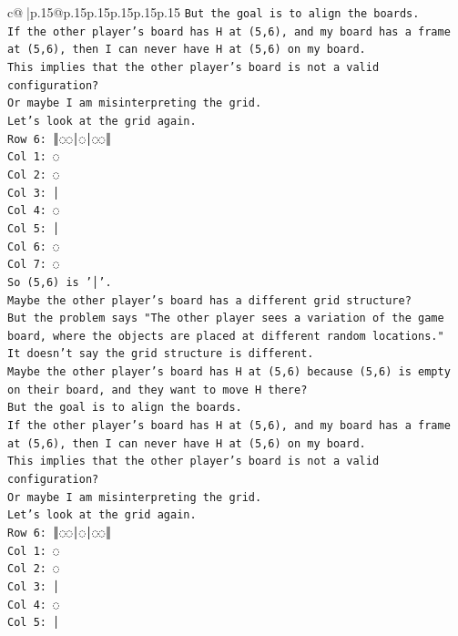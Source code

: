 \documentclass{article}
\begin{document}
{\begin{supertabular}{c@{$\;$}|p{.15\linewidth}@{}p{.15\linewidth}p{.15\linewidth}p{.15\linewidth}p{.15\linewidth}p{.15\linewidth}}
{{{\texttt{But the goal is to align the boards.} \\
\texttt{If the other player's board has H at (5,6), and my board has a frame at (5,6), then I can never have H at (5,6) on my board.} \\
\texttt{This implies that the other player's board is not a valid configuration?} \\
\texttt{Or maybe I am misinterpreting the grid.} \\
\texttt{Let's look at the grid again.} \\
\texttt{Row 6: ║◌◌│◌│◌◌║} \\
\texttt{Col 1: ◌} \\
\texttt{Col 2: ◌} \\
\texttt{Col 3: │} \\
\texttt{Col 4: ◌} \\
\texttt{Col 5: │} \\
\texttt{Col 6: ◌} \\
\texttt{Col 7: ◌} \\
\texttt{So (5,6) is '│'.} \\
\texttt{Maybe the other player's board has a different grid structure?} \\
\texttt{But the problem says "The other player sees a variation of the game board, where the objects are placed at different random locations."} \\
\texttt{It doesn't say the grid structure is different.} \\
\texttt{Maybe the other player's board has H at (5,6) because (5,6) is empty on their board, and they want to move H there?} \\
\texttt{But the goal is to align the boards.} \\
\texttt{If the other player's board has H at (5,6), and my board has a frame at (5,6), then I can never have H at (5,6) on my board.} \\
\texttt{This implies that the other player's board is not a valid configuration?} \\
\texttt{Or maybe I am misinterpreting the grid.} \\
\texttt{Let's look at the grid again.} \\
\texttt{Row 6: ║◌◌│◌│◌◌║} \\
\texttt{Col 1: ◌} \\
\texttt{Col 2: ◌} \\
\texttt{Col 3: │} \\
\texttt{Col 4: ◌} \\
\texttt{Col 5: │} \\
}}}
\end{supertabular}}
\end{document}
